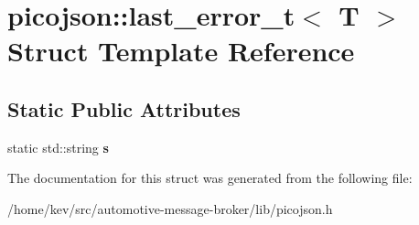 \hypertarget{structpicojson_1_1last__error__t}{\section{picojson\+:\+:last\+\_\+error\+\_\+t$<$ T $>$ Struct Template Reference}
\label{structpicojson_1_1last__error__t}
}
\subsection*{Static Public Attributes}
\begin{DoxyCompactItemize}
\item 
\hypertarget{structpicojson_1_1last__error__t_a270361f4321424bfd800c36607bf0411}{static std\+::string {\bfseries s}}\label{structpicojson_1_1last__error__t_a270361f4321424bfd800c36607bf0411}

\end{DoxyCompactItemize}


The documentation for this struct was generated from the following file\+:\begin{DoxyCompactItemize}
\item 
/home/kev/src/automotive-\/message-\/broker/lib/picojson.\+h\end{DoxyCompactItemize}
